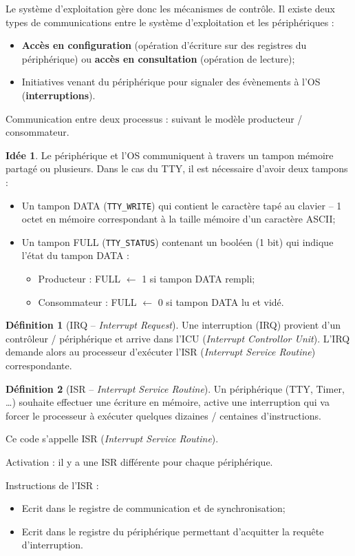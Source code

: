\documentclass[11pt,english,french]{scrreprt}
\theoremstyle{remark}
\theoremstyle{definition}
\newtheorem*{def*}{Définition}
\newtheorem*{idee*}{Idée}
\begin{document}
Le système d'exploitation gère donc les mécanismes de contrôle. Il existe deux types de communications entre le système d'exploitation et les périphériques :\begin{itemize}
	\item \textbf{Accès en configuration} (opération d'écriture sur des registres du périphérique) ou \textbf{accès en consultation} (opération de lecture);
	\item Initiatives venant du périphérique pour signaler des évènements à l'OS (\textbf{interruptions}). 
\end{itemize}

Communication entre deux processus : suivant le modèle producteur / consommateur.

\begin{idee*}
	Le périphérique et l'OS communiquent à travers un tampon mémoire partagé ou plusieurs. Dans le cas du TTY, il est nécessaire d'avoir deux tampons : \begin{itemize}
		\item Un tampon DATA (\lstinline!TTY_WRITE!) qui contient le caractère tapé au clavier -- 1 octet en mémoire correspondant à la taille mémoire d'un caractère ASCII;
		\item Un tampon FULL (\lstinline!TTY_STATUS!) contenant un booléen (1 bit) qui indique l'état du tampon DATA :\begin{itemize}
			\item Producteur : FULL $\leftarrow$ 1 si tampon DATA rempli;
			\item Consommateur : FULL $\leftarrow$ 0 si tampon DATA lu et vidé.
		\end{itemize}
	\end{itemize}
\end{idee*}

\begin{def*}[IRQ -- \emph{Interrupt Request}]
	Une interruption (IRQ) provient d'un contrôleur / périphérique et arrive dans l'ICU (\emph{Interrupt Controllor Unit}). L'IRQ demande alors au processeur d'exécuter l'ISR (\emph{Interrupt Service Routine}) correspondante.
\end{def*}

\begin{def*}[ISR -- \emph{Interrupt Service Routine}]
	Un périphérique (TTY, Timer, \dots) souhaite effectuer une écriture en mémoire, active une interruption qui va forcer le processeur à exécuter quelques dizaines / centaines d'instructions.

	Ce code s'appelle ISR (\emph{Interrupt Service Routine}).

	Activation : il y a une ISR différente pour chaque périphérique.

	Instructions de l'ISR :\begin{itemize}
		\item Ecrit dans le registre de communication et de synchronisation;
		\item Ecrit dans le registre du périphérique permettant d'acquitter la requête d'interruption.
	\end{itemize}
\end{def*}
\end{document}
